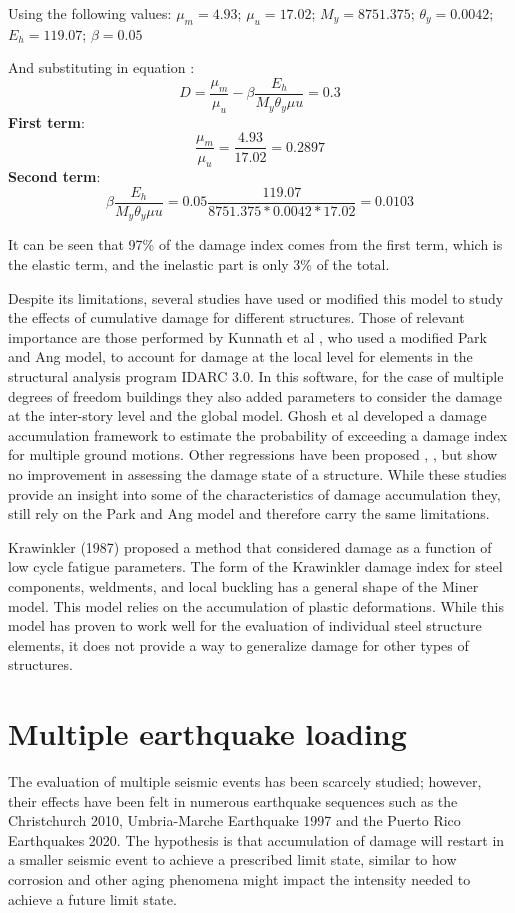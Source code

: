Using the following values: $\mu_{m}=4.93$; $\mu_{u}=17.02$; $M_{y}=8751.375$; $\theta_y=0.0042$; $E_{h}=119.07$; $\beta=0.05$ 

And substituting in equation :
\[
 D=\frac{\mu_{m}}{\mu_{u}}-\beta\frac{E_h}{M_{y}\theta_y\mu{u}}=0.3
	\]
\textbf{First term}:
\[
\frac{\mu_{m}}{\mu_{u}}=\frac{4.93}{17.02}=0.2897
\]
\textbf{Second term}: 
\[	
	\beta \frac{E_h}{M_{y}\theta_y\mu{u}}=0.05\frac{119.07}{8751.375*0.0042*17.02}=0.0103
\]

It can be seen that 97\% of the damage index comes from the first term, which is the elastic term, and the inelastic part is only 3\% of the total. 

Despite its limitations, several studies have used or modified this model to study the effects of cumulative damage for different structures. Those of relevant importance are those performed by Kunnath et al \cite{Kunnath1992}, who used a modified Park and Ang model, to account for damage at the local level for elements in the structural analysis program IDARC 3.0. In this software, for the case of multiple degrees of freedom buildings they also added parameters to consider the damage at the inter-story level and the global model. Ghosh et al \cite{Ghosh2015} developed a damage accumulation framework to estimate the probability of exceeding a damage index for multiple ground motions. Other regressions have been proposed \cite{Khashaee}, \cite{Fajfar1992}, \cite{Roufaiel} but show no improvement in assessing the damage state of a structure. While these studies provide an insight into some of the characteristics of damage accumulation they, still rely on the Park and Ang model and therefore carry the same limitations.

Krawinkler (1987) \cite{Krawinkler1987} proposed a method that considered damage as a function of low cycle fatigue parameters. The form of the Krawinkler damage index for steel components, weldments, and local buckling has a general shape of the Miner model. This model relies on the accumulation of plastic deformations. While this model has proven to work well for the evaluation of individual steel structure elements, it does not provide a way to generalize damage for other types of structures.


\section{Multiple earthquake loading}

The evaluation of multiple seismic events has been scarcely studied; however, their effects have been felt in numerous earthquake sequences such as the Christchurch 2010, Umbria-Marche Earthquake 1997 and the Puerto Rico Earthquakes 2020. The hypothesis is that accumulation of damage will restart in a smaller seismic event to achieve a prescribed limit state, similar to how corrosion and other aging phenomena might impact the intensity needed to achieve a future limit state. 

